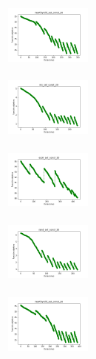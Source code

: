 \begin{figure}[H]
\begin{subfigure}
    \end{subfigure}
    \hfill
    \begin{subfigure}
        \centering
        \includegraphics[width=0.234\textwidth]{img/ils/newthyroid_set_const_20_277451237_cost.png}
    \end{subfigure}
    \hfill
    \begin{subfigure}
        \centering
        \includegraphics[width=0.234\textwidth]{img/ils/iris_set_const_20_49258669_cost.png}
    \end{subfigure}
    \hfill
    \begin{subfigure}
        \centering
        \includegraphics[width=0.234\textwidth]{img/ils/ecoli_set_const_20_49258669_cost.png}
    \end{subfigure}
    \hfill
    \begin{subfigure}
        \centering
        \includegraphics[width=0.234\textwidth]{img/ils/rand_set_const_20_49258669_cost.png}
    \end{subfigure}
    \hfill
    \begin{subfigure}
        \centering
        \includegraphics[width=0.234\textwidth]{img/ils/newthyroid_set_const_20_49258669_cost.png}
    \end{subfigure}
    \hfill
    \begin{subfigure}

\end{subfigure}
\end{figure}
